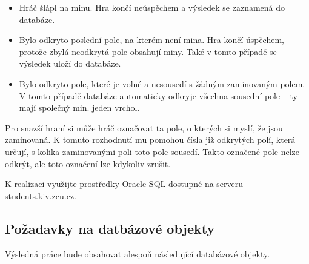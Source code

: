 \documentclass[12pt, a4paper]{article}
\begin{document}
\begin{itemize}
\item Hráč šlápl na minu. Hra končí neúspěchem a výsledek se zaznamená do databáze.
\item Bylo odkryto poslední pole, na kterém není mina. Hra končí úspěchem, protože zbylá neodkrytá pole obsahují miny. Také v tomto případě se výsledek uloží do databáze.
\item Bylo odkryto pole, které je volné a nesousedí s žádným zaminovaným polem. V tomto případě databáze automaticky odkryje všechna sousední pole – ty mají společný min. jeden vrchol.
\end{itemize}

Pro snazší hraní si může hráč označovat ta pole, o kterých si myslí, že jsou zaminovaná. K tomuto rozhodnutí mu pomohou čísla již odkrytých polí, která určují, s kolika zaminovanými poli toto pole sousedí. Takto označené pole nelze odkrýt, ale toto označení lze kdykoliv zrušit.

K realizaci využijte prostředky Oracle SQL dostupné na serveru students.kiv.zcu.cz.

\subsection{Požadavky na datbázové objekty}

Výsledná práce bude obsahovat alespoň následující databázové objekty.
\end{document}
